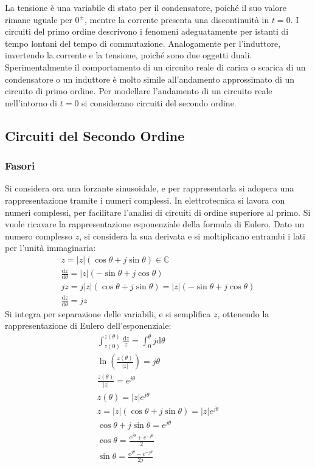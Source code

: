 \documentclass{article}
\newcommand{\df}{\mathrm{d}}
\numberwithin{equation}{subsection}
\begin{document}
La tensione è una variabile di stato per il condensatore, poiché il suo valore rimane uguale per $0^{\pm}$, mentre la corrente presenta una discontinuità in $t=0$. I 
circuiti del primo ordine descrivono i fenomeni adeguatamente per istanti di tempo lontani del tempo di commutazione. %
Analogamente per l'induttore, invertendo la corrente e la tensione, poiché sono due oggetti duali. 
Sperimentalmente il comportamento di un circuito reale di carica o scarica di un condensatore o un induttore è molto simile all'andamento approssimato di un circuito di primo 
ordine. Per modellare l'andamento di un circuito reale nell'intorno di $t=0$ si considerano circuiti del secondo ordine. 

\subsection{Circuiti del Secondo Ordine}

\subsubsection{Fasori}

Si considera ora una forzante sinusoidale, e per rappresentarla si adopera una rappresentazione tramite i numeri complessi. 
In elettrotecnica si lavora con numeri complessi, per facilitare l'analisi di circuiti di ordine superiore al primo. 
Si vuole ricavare la rappresentazione esponenziale della formula di Eulero. 
Dato un numero complesso $z$, si considera la sua derivata e si moltiplicano entrambi i lati per l'unità immaginaria:
\begin{gather*}
    z=|z|(\cos\theta+j\sin\theta)\in\mathbb{C}\\
    \displaystyle\frac{\df z}{\df\theta}=|z|(-\sin\theta+j\cos\theta)\\
    jz=j|z|(\cos\theta+j\sin\theta)=|z|(-\sin\theta+j\cos\theta)\\
    \displaystyle\frac{\df z}{\df\theta}=jz
\end{gather*}
Si integra per separazione delle variabili, e si semplifica $z$, ottenendo la rappresentazione di Eulero dell'esponenziale: 
\begin{gather*}
    \displaystyle\int_{z(0)}^{z(\theta)}\frac{\df z}{z}=\int_{0}^{\theta}j\df\theta\\
    \ln\left(\displaystyle\frac{z(\theta)}{|z|}\right)=j\theta\\
    \displaystyle\frac{z(\theta)}{|z|}=e^{j\theta}\\
    z(\theta)=|z|e^{j\theta}\\
    z=|z|(\cos\theta+j\sin\theta)=|z|e^{j\theta}\\
    \cos\theta+j\sin\theta=e^{j\theta}\\
    \cos\theta=\displaystyle\frac{e^{j\theta}+e^{-j\theta}}{2}\\
    \sin\theta=\displaystyle\frac{e^{j\theta}-e^{-j\theta}}{2j}
\end{gather*}
\end{document}

